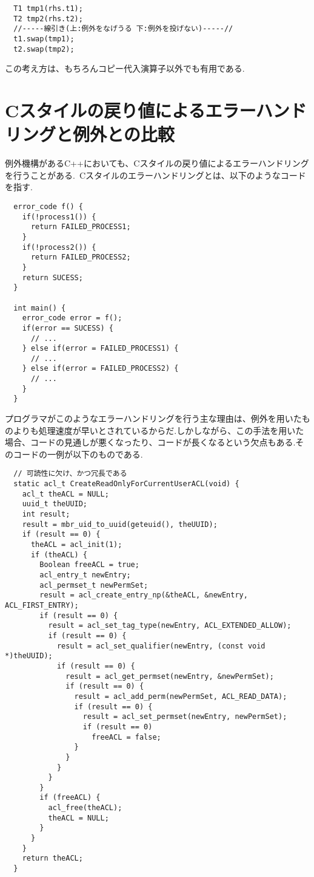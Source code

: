 \documentclass[a4j,11pt,openright]{jsbook}
\begin{document}
\begin{verbatim}
  T1 tmp1(rhs.t1);
  T2 tmp2(rhs.t2);
  //-----線引き(上:例外をなげうる 下:例外を投げない)-----//
  t1.swap(tmp1);
  t2.swap(tmp2);
\end{verbatim}

この考え方は、もちろんコピー代入演算子以外でも有用である.

\section{Cスタイルの戻り値によるエラーハンドリングと例外との比較}

例外機構があるC++においても、Cスタイルの戻り値によるエラーハンドリングを行うことがある.\ Cスタイルのエラーハンドリングとは、以下のようなコードを指す.

\begin{verbatim}
  error_code f() {
    if(!process1()) {
      return FAILED_PROCESS1;
    }
    if(!process2()) {
      return FAILED_PROCESS2;
    }
    return SUCESS;
  }

  int main() {
    error_code error = f();
    if(error == SUCESS) {
      // ...
    } else if(error = FAILED_PROCESS1) {
      // ...
    } else if(error = FAILED_PROCESS2) {
      // ...
    }
  }
\end{verbatim}

プログラマがこのようなエラーハンドリングを行う主な理由は、例外を用いたものよりも処理速度が早いとされているからだ.しかしながら、この手法を用いた場合、コードの見通しが悪くなったり、コードが長くなるという欠点もある.そのコードの一例\cite{JonKalb}が以下のものである.

\begin{verbatim}
  // 可読性に欠け、かつ冗長である
  static acl_t CreateReadOnlyForCurrentUserACL(void) {
    acl_t theACL = NULL;
    uuid_t theUUID;
    int result;
    result = mbr_uid_to_uuid(geteuid(), theUUID);
    if (result == 0) {
      theACL = acl_init(1);
      if (theACL) {
        Boolean freeACL = true;
        acl_entry_t newEntry;
        acl_permset_t newPermSet;
        result = acl_create_entry_np(&theACL, &newEntry, ACL_FIRST_ENTRY);
        if (result == 0) {
          result = acl_set_tag_type(newEntry, ACL_EXTENDED_ALLOW);
          if (result == 0) {
            result = acl_set_qualifier(newEntry, (const void *)theUUID);
            if (result == 0) {
              result = acl_get_permset(newEntry, &newPermSet);
              if (result == 0) {
                result = acl_add_perm(newPermSet, ACL_READ_DATA);
                if (result == 0) {
                  result = acl_set_permset(newEntry, newPermSet);
                  if (result == 0)
                    freeACL = false;
                }
              }
            }
          }
        }
        if (freeACL) {
          acl_free(theACL);
          theACL = NULL;
        }
      }
    }
    return theACL;
  }
\end{verbatim}
\end{document}
